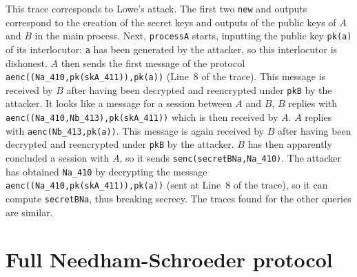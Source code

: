 \documentclass{book}
\begin{document}
%
This trace corresponds to Lowe's attack. The first two \lstinline!new! and
outputs correspond to the creation of the secret keys and outputs of the
public keys of $A$ and $B$ in the main process.
Next, \lstinline!processA! starts, inputting the public
key \lstinline!pk(a)! of its interlocutor: \lstinline!a! has been
generated by the attacker, so this interlocutor is dishonest. $A$
then sends the first message of the protocol
\lstinline!aenc((Na_410,pk(skA_411)),pk(a))! (Line~8 of the
trace). This message is received by $B$ after having been decrypted
and reencrypted under \lstinline!pkB! by the attacker. It looks like
a message for a session between $A$ and $B$, $B$ replies with
\lstinline!aenc((Na_410,Nb_413),pk(skA_411))! which is then
received by $A$. $A$ replies with
\lstinline!aenc(Nb_413,pk(a))!. This message is again received by
$B$ after having been decrypted and reencrypted under \lstinline!pkB!
by the attacker. $B$ has then apparently concluded a session with
$A$, so it sends \lstinline!senc(secretBNa,Na_410)!. The attacker
has obtained \lstinline!Na_410! by decrypting the message
\lstinline!aenc((Na_410,pk(skA_411)),pk(a))! (sent at Line~8 of
the trace), so it can compute \lstinline!secretBNa!, thus breaking
secrecy.
%
The traces found for the other queries are similar.


\section{Full Needham-Schroeder protocol}\label{sec:caseStudyFull}
\end{document}
